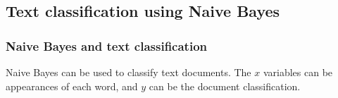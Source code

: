 
\subsection{Text classification using Naive Bayes}

\subsubsection{Naive Bayes and text classification}

Naive Bayes can be used to classify text documents. The \(x\) variables can be appearances of each word, and \(y\) can be the document classification.

